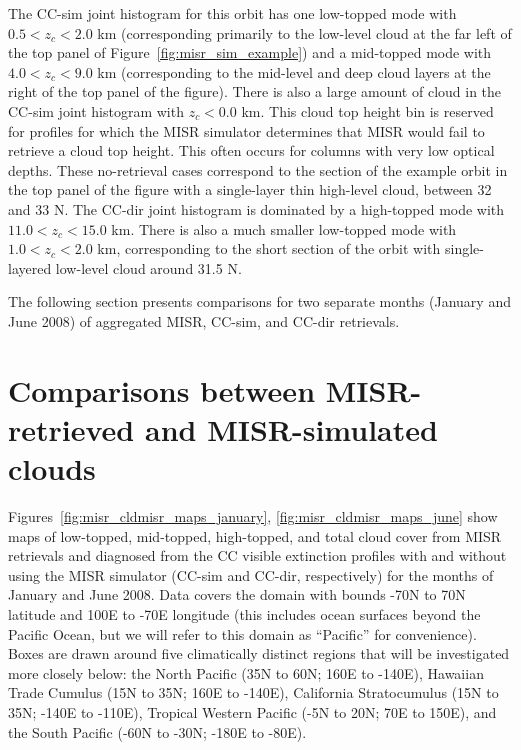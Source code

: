 The CC-sim joint histogram for this orbit has one low-topped mode with
\(0.5 < z_c < 2.0\) km (corresponding primarily to the low-level cloud
at the far left of the top panel of Figure~\ref{fig:misr_sim_example})
and a mid-topped mode with \(4.0 < z_c < 9.0\) km (corresponding to the
mid-level and deep cloud layers at the right of the top panel of the
figure). There is also a large amount of cloud in the CC-sim joint
histogram with \(z_c < 0.0\) km. This cloud top height bin is reserved
for profiles for which the MISR simulator determines that MISR would
fail to retrieve a cloud top height. This often occurs for columns with
very low optical depths. These no-retrieval cases correspond to the
section of the example orbit in the top panel of the figure with a
single-layer thin high-level cloud, between 32 and 33 N. The CC-dir
joint histogram is dominated by a high-topped mode with
\(11.0 < z_c < 15.0\) km. There is also a much smaller low-topped mode
with \(1.0 < z_c < 2.0\) km, corresponding to the short section of the
orbit with single-layered low-level cloud around 31.5 N.

The following section presents comparisons for two separate months
(January and June 2008) of aggregated MISR, CC-sim, and CC-dir
retrievals.

\section{Comparisons between MISR-retrieved and MISR-simulated
clouds}\label{sec:misrux5fresults}

Figures~\ref{fig:misr_cldmisr_maps_january}, \ref{fig:misr_cldmisr_maps_june}
show maps of low-topped, mid-topped, high-topped, and total cloud cover
from MISR retrievals and diagnosed from the CC visible extinction
profiles with and without using the MISR simulator (CC-sim and CC-dir,
respectively) for the months of January and June 2008. Data covers the
domain with bounds -70N to 70N latitude and 100E to -70E longitude (this
includes ocean surfaces beyond the Pacific Ocean, but we will refer to
this domain as ``Pacific'' for convenience). Boxes are drawn around five
climatically distinct regions that will be investigated more closely
below: the North Pacific (35N to 60N; 160E to -140E), Hawaiian Trade
Cumulus (15N to 35N; 160E to -140E), California Stratocumulus (15N to
35N; -140E to -110E), Tropical Western Pacific (-5N to 20N; 70E to
150E), and the South Pacific (-60N to -30N; -180E to -80E).

